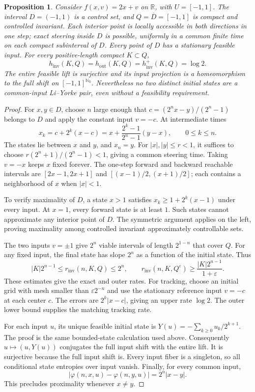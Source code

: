 \documentclass[11pt,a4paper]{article}
\newtheorem{proposition}[theorem]{Proposition}
\theoremstyle{remark}
\newcommand{\hinv}{h_{\mathrm{inv}}}
\newcommand{\hout}{h_{\mathrm{out}}}
\newcommand{\htrack}{h_{\mathrm{inv}}^+}
\newcommand{\rinv}{r_{\mathrm{inv}}}
\begin{document}
\begin{proposition}\label{prop:control-set}
Consider $f(x,v)=2x+v$ on $\mathbb R$, with $U=[-1,1]$.
The interval $D=(-1,1)$ is a control set, and $Q=\overline D=[-1,1]$
is compact and controlled invariant. Each interior point is locally
accessible in both directions in one step; exact steering inside $D$
is possible, uniformly in a common finite time on each compact
subinterval of $D$. Every point of $D$ has a stationary feasible input.
For every positive-length compact $K\subset Q$,
\[
 \hinv(K,Q)=\hout(K,Q)=\htrack(K,Q)=\log2.
\]
The entire feasible lift is surjective and its input projection is a
homeomorphism to the full shift on $[-1,1]^{\mathbb N_0}$.
Nevertheless no two distinct initial states are a common-input
Li--Yorke pair, even without a feasibility requirement.
\end{proposition}
\begin{proof}
For $x,y\in D$, choose $n$ large enough that
$c=(2^nx-y)/(2^n-1)$ belongs to $D$ and apply the constant input $v=-c$.
At intermediate times
\[
 x_k=c+2^k(x-c)
     =x+\frac{2^k-1}{2^n-1}(y-x),\qquad 0\leq k\leq n.
\]
The states lie between $x$ and $y$, and $x_n=y$.
For $|x|,|y|\leq r<1$, it suffices to choose
$r(2^n+1)/(2^n-1)<1$, giving a common steering time.
Taking $v=-x$ keeps $x$ fixed forever.
The one-step forward and backward reachable intervals are
$[2x-1,2x+1]$ and $[(x-1)/2,(x+1)/2]$; each contains a neighborhood of
$x$ when $|x|<1$.

To verify maximality of $D$, a state $x>1$ satisfies
$x_k\geq1+2^k(x-1)$ under every input. At $x=1$, every forward state is
at least $1$. Such states cannot approximate any interior point of $D$.
The symmetric argument applies on the left, proving maximality among
controlled invariant approximately controllable sets.

The two inputs $v=\pm1$ give $2^n$ viable intervals of length $2^{1-n}$
that cover $Q$. For any fixed input, the final state has slope $2^n$
as a function of the initial state. Thus
\[
 |K|2^{n-1}\leq\rinv(n,K,Q)\leq2^n,
 \qquad
 \rinv(n,K,Q^\varepsilon)\geq\frac{|K|2^{n-1}}{1+\varepsilon}.
\]
These estimates give the exact and outer rates.
For tracking, choose an initial grid with mesh smaller than
$\varepsilon2^{-n}$ and use the stationary reference input $v=-c$ at
each center $c$. The errors are $2^k|x-c|$, giving an upper rate $\log2$.
The outer lower bound supplies the matching tracking rate.

For each input $u$, its unique feasible initial state is
$Y(u)=-\sum_{k\geq0}u_k/2^{k+1}$.
The proof is the same bounded-state calculation used above.
Consequently $u\mapsto(u,Y(u))$ conjugates the full input shift with the
entire lift. It is surjective because the full input shift is.
Every input fiber is a singleton, so all conditional state entropies
over input vanish.
Finally, for every common input,
\[
 |\varphi(n,x,u)-\varphi(n,y,u)|=2^n|x-y|.
\]
This precludes proximality whenever $x\ne y$.
\end{proof}
\end{document}
